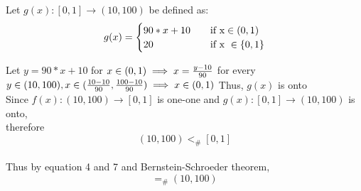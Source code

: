 \documentclass{article}
\begin{document}
Let \begin{math}
g(x): [0,1] \to (10, 100)
\end{math}  be defined as:
\begin{equation}
g(x) = 
     \begin{cases}
       \text{\begin{math}
       90*x+10
       \end{math}} &\quad\text{if x} \in (0,1)\\
       \text{20} &\quad\text{if x } \in \{0, 1\} \\
     \end{cases}
\end{equation}
    
Let \begin{math}
y=90*x+10
\end{math} for \begin{math}
x \in (0,1) \\
\implies x=\frac{y-10}{90} \\
\end{math} 
for every \begin{math}
 y \in (10, 100), x \in (\frac{10-10}{90}, \frac{100-10}{90}) \\
\implies x \in (0, 1) \\
\end{math} 
Thus, \begin{math}
g(x)
\end{math} is onto \\

Since \begin{math}
f(x): (10, 100) \to [0, 1]
\end{math} is one-one and \begin{math}
g(x): [0,1] \to (10, 100)
\end{math} is onto, \\ therefore \begin{equation}
(10, 100) <_{\#} [0, 1]
\end{equation} \\

Thus by equation 4 and 7 and Bernstein-Schroeder theorem, \begin{equation}
[0, 1] =_{\#} (10, 100)    
\end{equation}
\end{document}
